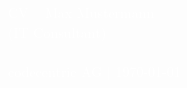 \newcommand{\cccvname}{Max Mustermann}
\newcommand{\cccvjobtitle}{IT Consultant}

\NoBgThispage
\AddToShipoutPicture*{\BackgroundPic}
\vspace*{18.5cm}
\noindent
\textcolor{white}{
{\Huge CV -- \cccvname}\\[8pt]
{\huge (\cccvjobtitle)}\\
\\[8pt]
{\Large codecentric AG | \today}
}

